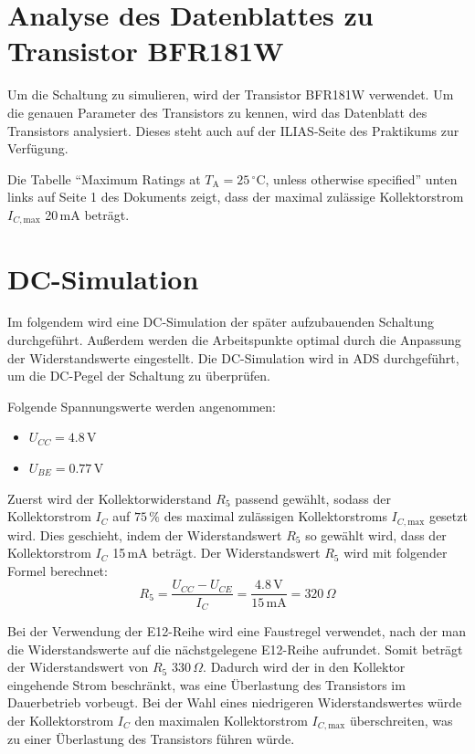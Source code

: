\section{Analyse des Datenblattes zu Transistor BFR181W}
Um die Schaltung zu simulieren, wird der Transistor BFR181W verwendet. Um die genauen Parameter des Transistors zu kennen, wird das Datenblatt des Transistors analysiert.
Dieses steht auch auf der ILIAS-Seite des Praktikums zur Verfügung.

Die Tabelle \enquote{Maximum Ratings at $T_\mathrm{A}=25\,^\circ\mathrm{C}$, unless otherwise specified} unten links auf Seite 1 des Dokuments zeigt, dass der maximal zulässige Kollektorstrom $I_{C,\mathrm{max}}$ 20\,mA beträgt.
\section{DC-Simulation}
Im folgendem wird eine DC-Simulation der später aufzubauenden Schaltung durchgeführt. 
Außerdem werden die Arbeitspunkte optimal durch die Anpassung der Widerstandswerte eingestellt.
Die DC-Simulation wird in \ac{ADS} durchgeführt, um die DC-Pegel der Schaltung zu überprüfen.

Folgende Spannungswerte werden angenommen:
\begin{itemize}
    \item $U_{CC} = 4.8\,\mathrm{V}$
    \item $U_{BE} = 0.77\,\mathrm{V}$
\end{itemize}

Zuerst wird der Kollektorwiderstand $R_5$ passend gewählt, sodass der Kollektorstrom $I_C$ auf $75\,\%$ des maximal zulässigen Kollektorstroms $I_{C,\mathrm{max}}$ gesetzt wird. 
Dies geschieht, indem der Widerstandswert $R_5$ so gewählt wird, dass der Kollektorstrom $I_C$ 15\,mA beträgt.
Der Widerstandswert $R_5$ wird mit folgender Formel berechnet:
\begin{equation}
    R_5 = \frac{U_{CC} - U_{CE}}{I_C} = \frac{4.8\,\mathrm{V}}{15\,\mathrm{mA}} = 320\,\Omega
\end{equation}

Bei der Verwendung der E12-Reihe wird eine Faustregel verwendet, nach der man die Widerstandswerte auf die nächstgelegene E12-Reihe aufrundet. 
Somit beträgt der Widerstandswert von $R_5$ 330\,\(\Omega\). Dadurch wird der in den Kollektor eingehende Strom beschränkt, was eine Überlastung des Transistors im Dauerbetrieb vorbeugt. Bei der Wahl eines niedrigeren Widerstandswertes würde der Kollektorstrom $I_C$ den maximalen Kollektorstrom $I_{C,\mathrm{max}}$ überschreiten, was zu einer Überlastung des Transistors führen würde.

